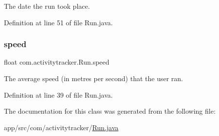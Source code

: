 The date the run took place. 

Definition at line 51 of file Run.\+java.

\mbox{\label{classcom_1_1activitytracker_1_1_run_ada0c6e189d55997133cde5bbe9913984}} 
\subsubsection{\texorpdfstring{speed}{speed}}
{\footnotesize\ttfamily float com.\+activitytracker.\+Run.\+speed\hspace{0.3cm}{\ttfamily [private]}}

The average speed (in metres per second) that the user ran. 

Definition at line 39 of file Run.\+java.



The documentation for this class was generated from the following file\+:\begin{DoxyCompactItemize}
\item 
app/src/com/activitytracker/\mbox{\hyperlink{_run_8java}{Run.\+java}}\end{DoxyCompactItemize}
